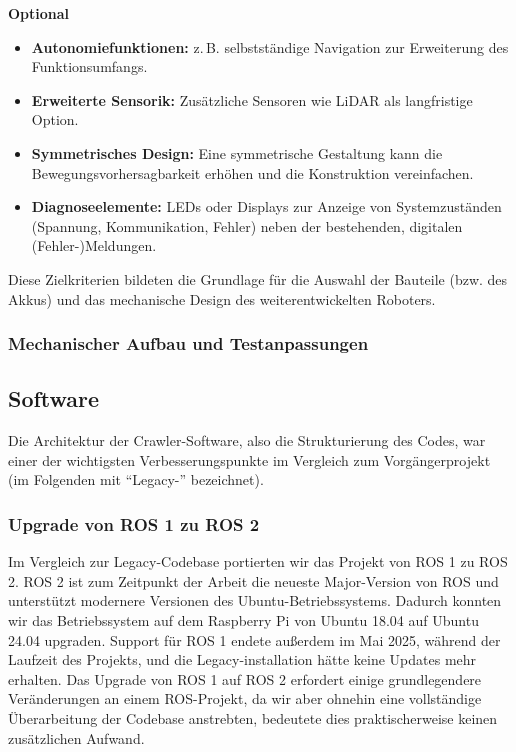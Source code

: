 \textbf{Optional}
\begin{itemize}
  \item \textbf{Autonomiefunktionen:} z.\,B. selbstständige Navigation zur Erweiterung des Funktionsumfangs.
  \item \textbf{Erweiterte Sensorik:} Zusätzliche Sensoren wie LiDAR als langfristige Option.
  \item \textbf{Symmetrisches Design:} Eine symmetrische Gestaltung kann die Bewegungsvorhersagbarkeit erhöhen und die Konstruktion vereinfachen.
  \item \textbf{Diagnoseelemente:} LEDs oder Displays zur Anzeige von Systemzuständen (Spannung, Kommunikation, Fehler) neben der bestehenden, digitalen (Fehler-)Meldungen.
\end{itemize}

Diese Zielkriterien bildeten die Grundlage für die Auswahl der Bauteile (bzw. des Akkus) und das mechanische Design des weiterentwickelten Roboters.

\subsubsection{Mechanischer Aufbau und Testanpassungen}

\subsection{Software}

Die Architektur der Crawler-Software, also die Strukturierung des Codes, war einer der wichtigsten Verbesserungspunkte im Vergleich zum Vorgängerprojekt (im Folgenden mit ``Legacy-'' bezeichnet). 


\subsubsection{Upgrade von ROS 1 zu ROS 2}

Im Vergleich zur Legacy-Codebase portierten wir das Projekt von ROS 1 zu ROS 2. ROS 2 ist zum Zeitpunkt der Arbeit die neueste Major-Version von ROS und unterstützt modernere Versionen des Ubuntu-Betriebssystems. Dadurch konnten wir das Betriebssystem auf dem Raspberry Pi von Ubuntu 18.04 auf Ubuntu 24.04 upgraden. Support für ROS 1 endete außerdem im Mai 2025, während der Laufzeit des Projekts, und die Legacy-installation hätte keine Updates mehr erhalten. Das Upgrade von ROS 1 auf ROS 2 erfordert einige grundlegendere Veränderungen an einem ROS-Projekt, da wir aber ohnehin eine vollständige Überarbeitung der Codebase anstrebten, bedeutete dies praktischerweise keinen zusätzlichen Aufwand. 

